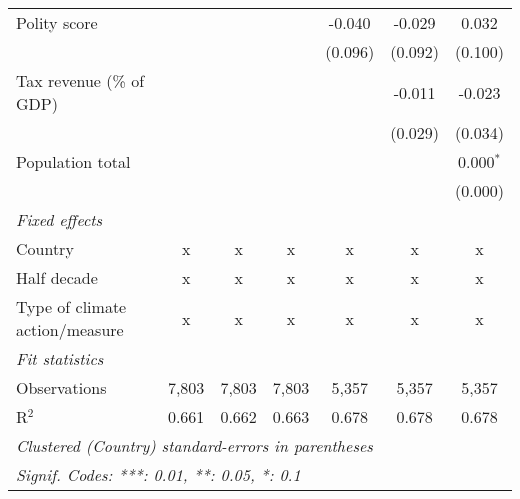 \begin{tabular}{lcccccc}
   Polity score                                                  &              &                &                & -0.040         & -0.029         & 0.032\\   
                                                                 &              &                &                & (0.096)        & (0.092)        & (0.100)\\   
   Tax revenue (\% of GDP)                                       &              &                &                &                & -0.011         & -0.023\\   
                                                                 &              &                &                &                & (0.029)        & (0.034)\\   
   Population total                                              &              &                &                &                &                & 0.000$^{*}$\\   
                                                                 &              &                &                &                &                & (0.000)\\   
   \emph{Fixed effects}\\
   Country                                                       & x            & x              & x              & x              & x              & x\\  
   Half decade                                                   & x            & x              & x              & x              & x              & x\\  
   Type of climate action/measure                                & x            & x              & x              & x              & x              & x\\  
   \midrule \emph{Fit statistics}\\
   Observations                                                  & 7,803        & 7,803          & 7,803          & 5,357          & 5,357          & 5,357\\  
   R$^2$                                                         & 0.661        & 0.662          & 0.663          & 0.678          & 0.678          & 0.678\\  
   \midrule
   \multicolumn{7}{l}{\emph{Clustered (Country) standard-errors in parentheses}}\\
   \multicolumn{7}{l}{\emph{Signif. Codes: ***: 0.01, **: 0.05, *: 0.1}}\\
\end{tabular}
\par\endgroup


